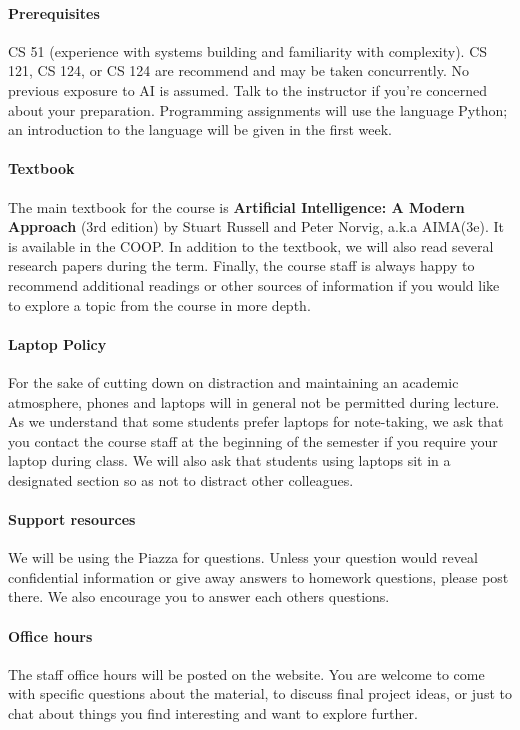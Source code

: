 \documentclass[11pt]{article}
\begin{document}
\paragraph{Prerequisites}

CS 51 (experience with systems building and familiarity with
complexity). CS 121, CS 124, or CS 124 are recommend and may be taken
concurrently. No previous exposure to AI is assumed. Talk to the
instructor if you're concerned about your preparation.  Programming
assignments will use the language Python; an introduction to the
language will be given in the first week.

\paragraph{Textbook}

The main textbook for the course is \textbf{Artificial Intelligence: A
  Modern Approach} (3rd edition) by Stuart Russell and Peter Norvig,
a.k.a AIMA(3e). It is available in the COOP. In addition to the
textbook, we will also read several research papers during the
term. Finally, the course staff is always happy to recommend
additional readings or other sources of information if you would like
to explore a topic from the course in more depth.

\paragraph{Laptop Policy}

For the sake of cutting down on distraction and maintaining an
academic atmosphere, phones and laptops will in general not be
permitted during lecture. As we understand that some students prefer
laptops for note-taking, we ask that you contact the course staff at
the beginning of the semester if you require your laptop during
class. We will also ask that students using laptops sit in a designated
section so as not to distract other colleagues.

\paragraph{Support resources}

We will be using the Piazza for questions. Unless your question would
reveal confidential information or give away answers to homework
questions, please post there. We also encourage you to answer each
others questions.

\paragraph{Office hours} 
The staff office hours will be posted on the
website. You are welcome to come with specific questions about the
material, to discuss final project ideas, or just to chat about things
you find interesting and want to explore further.
\end{document}
